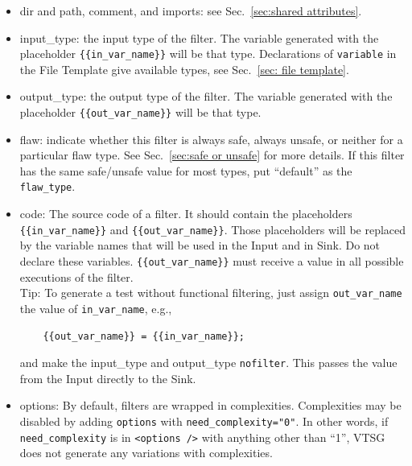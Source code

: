 \begin{itemize}
    \item dir and path, comment, and imports: see Sec.~\ref{sec:shared attributes}.

    \item input\_type: the input type of the filter. The variable 
    generated with
    the placeholder \verb|{{in_var_name}}| will be that type.
    Declarations of \verb|variable| in the File Template give
    available types, see Sec.~\ref{sec: file template}.

    \item output\_type: the output type of the filter.  The variable generated
    with the placeholder \verb|{{out_var_name}}| will be that type.

    \item flaw: indicate whether this filter is always safe, always unsafe, or
      neither for a particular flaw type.  See Sec.~\ref{sec:safe or unsafe} for
      more details.  If this filter has the same safe/unsafe value for most
      types, put ``default'' as the \verb|flaw_type|.

    \item code: The source code of a filter. It should contain the placeholders
    \\
    \verb|{{in_var_name}}| and \verb|{{out_var_name}}|.  Those placeholders will 
    be replaced by the variable names that will be used in the Input and in Sink.  Do
    not declare these variables.
    \verb|{{out_var_name}}| must receive a value in all possible executions of the
    filter.
    \\
    Tip: To generate a test without functional filtering, just assign
    \verb|out_var_name| the value of \verb|in_var_name|, e.g.,
\begin{verbatim}
    {{out_var_name}} = {{in_var_name}};
\end{verbatim}
    and make the input\_type and output\_type \verb|nofilter|.
    This passes the value from the Input directly to the Sink.

    \item options: By default, filters are wrapped in complexities.  Complexities may
      be disabled by adding \verb|options| with \verb|need_complexity="0"|.
      \label{sec:need complexity}
      In other words, if \linebreak[4] \verb|need_complexity| is in
      \verb|<options />| with anything other than ``1'', VTSG does not generate any
      variations with complexities.
\end{itemize}

